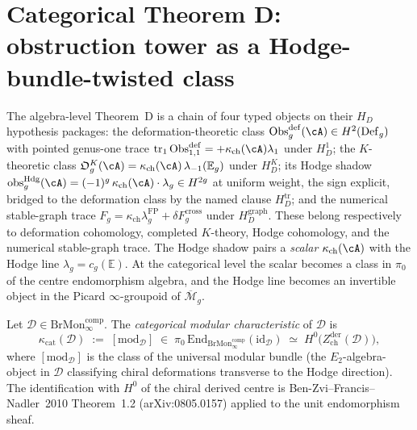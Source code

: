 \section{Categorical Theorem D: obstruction tower as a Hodge-bundle-twisted class}
\label{sec:cy-c-beyond-cat-thm-D}

The algebra-level Theorem~D is a chain of four typed objects on their
$H_D$ hypothesis packages: the deformation-theoretic class
$\operatorname{Obs}^{\mathrm{def}}_g(\cA) \in H^2(\operatorname{Def}_g)$
with pointed genus-one trace
$\operatorname{tr}_1\operatorname{Obs}^{\mathrm{def}}_{1,1}
= +\kappa_{\mathrm{ch}}(\cA)\lambda_1$ under $H_D^1$; the $K$-theoretic
class $\mathfrak O_g^K(\cA) = \kappa_{\mathrm{ch}}(\cA)\,
\lambda_{-1}(\mathbb E_g)$ under $H_D^K$; its Hodge shadow
$\mathrm{obs}_g^{\mathrm{Hdg}}(\cA)
= (-1)^g\,\kappa_{\mathrm{ch}}(\cA)\cdot\lambda_g \in H^{2g}$ at uniform
weight, the sign explicit, bridged to the deformation class by the
named clause $H_D^{\mathrm{tr}}$; and the numerical stable-graph trace
$F_g = \kappa_{\mathrm{ch}}\lambda_g^{\mathrm{FP}}
+ \delta F_g^{\mathrm{cross}}$ under $H_D^{\mathrm{graph}}$.  These
belong respectively to deformation cohomology, completed $K$-theory,
Hodge cohomology, and the numerical stable-graph trace.  The Hodge
shadow pairs a \emph{scalar} $\kappa_{\mathrm{ch}}(\cA)$ with the Hodge
line $\lambda_g = c_g(\mathbb E)$. At the categorical level the scalar
becomes a class in $\pi_0$ of the centre endomorphism algebra, and the
Hodge line becomes an invertible object in the Picard
$\infty$-groupoid of $\overline{\mathcal M}_g$.

\begin{definition}
\label{def:cy-c-cat-kappa}
Let $\mathcal D \in \mathrm{BrMon}^{\mathrm{comp}}_\infty$. The
\emph{categorical modular characteristic} of $\mathcal D$ is
\[
 \kappa_{\mathrm{cat}}(\mathcal D)
 \;:=\;
 [\mathrm{mod}_{\mathcal D}]
 \;\in\;
 \pi_0 \, \mathrm{End}_{\mathrm{BrMon}^{\mathrm{comp}}_\infty}(\mathrm{id}_{\mathcal D})
 \;\simeq\;
 H^0\!\bigl(Z^{\mathrm{der}}_{\mathrm{ch}}(\mathcal D)\bigr),
\]
where $[\mathrm{mod}_{\mathcal D}]$ is the class of the universal
modular bundle (the $E_2$-algebra-object in $\mathcal D$ classifying
chiral deformations transverse to the Hodge direction). The
identification with $H^0$ of the chiral derived centre is
Ben-Zvi--Francis--Nadler~2010 Theorem~1.2 (arXiv:0805.0157) applied to
the unit endomorphism sheaf.
\end{definition}

